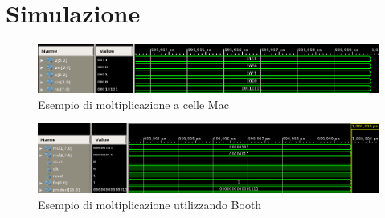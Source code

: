 %

\section{Simulazione}

\begin{figure}[H]
	\centering
\includegraphics[scale=0.55]{esercizio13/images/mac_mul_testbench.png}
	\caption{Esempio di moltiplicazione a celle Mac}
\end{figure}

\begin{figure}[H]
	\centering
\includegraphics[scale=0.55]{esercizio13/images/Booth_mul_tesbench.png}
	\caption{Esempio di moltiplicazione utilizzando Booth}
\end{figure}%


